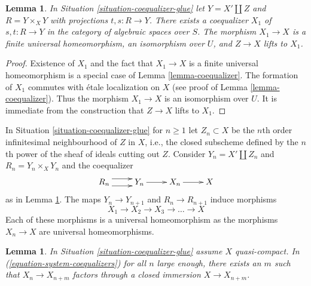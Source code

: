 \documentclass{stacks-project}
\theoremstyle{plain}
\newtheorem{lemma}[subsection]{Lemma}
\theoremstyle{definition}
\theoremstyle{remark}
\numberwithin{equation}{subsection}
\begin{document}
\begin{lemma}
\label{lemma-coequalizer-glue}
In Situation \ref{situation-coequalizer-glue} let $Y = X' \amalg Z$ and
$R = Y \times_X Y$ with projections $t, s : R \to Y$. There exists a
coequalizer $X_1$ of $s, t : R \to Y$ in the category of algebraic spaces
over $S$. The morphism $X_1 \to X$ is a finite universal homeomorphism,
an isomorphism over $U$, and $Z \to X$ lifts to $X_1$.
\end{lemma}

\begin{proof}
Existence of $X_1$ and the fact that $X_1 \to X$ is a finite
universal homeomorphism is a special case of Lemma \ref{lemma-coequalizer}.
The formation of $X_1$ commutes with \'etale localization on $X$
(see proof of Lemma \ref{lemma-coequalizer}).
Thus the morphism $X_1 \to X$ is an isomorphism over $U$.
It is immediate from the construction that $Z \to X$ lifts to $X_1$.
\end{proof}

\noindent
In Situation \ref{situation-coequalizer-glue} for $n \geq 1$ let
$Z_n \subset X$ be the $n$th order infinitesimal neighbourhood
of $Z$ in $X$, i.e., the closed subscheme defined by the $n$th
power of the sheaf of ideals cutting out $Z$. Consider $Y_n = X' \amalg Z_n$
and $R_n = Y_n \times_X Y_n$ and the coequalizer
$$
\xymatrix{
R_n \ar@<1ex>[r] \ar@<-1ex>[r] & Y_n \ar[r] & X_n \ar[r] & X
}
$$
as in Lemma \ref{lemma-coequalizer-glue}. The maps $Y_n \to Y_{n + 1}$
and $R_n \to R_{n + 1}$ induce morphisms
\begin{equation}
\label{equation-system-coequalizers}
X_1 \to X_2 \to X_3 \to \ldots \to X
\end{equation}
Each of these morphisms is a universal homeomorphism as the morphisms
$X_n \to X$ are universal homeomorphisms.

\begin{lemma}
\label{lemma-essentially-constant}
In Situation \ref{situation-coequalizer-glue} assume $X$ quasi-compact.
In (\ref{equation-system-coequalizers}) for all $n$ large enough, there
exists an $m$ such that $X_n \to X_{n + m}$ factors through a
closed immersion $X \to X_{n + m}$.
\end{lemma}
\end{document}
